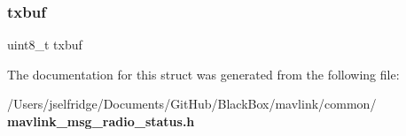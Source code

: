 \subsubsection{txbuf}
{\footnotesize\ttfamily uint8\+\_\+t txbuf}



The documentation for this struct was generated from the following file\+:\begin{DoxyCompactItemize}
\item 
/\+Users/jselfridge/\+Documents/\+Git\+Hub/\+Black\+Box/mavlink/common/\textbf{ mavlink\+\_\+msg\+\_\+radio\+\_\+status.\+h}\end{DoxyCompactItemize}
